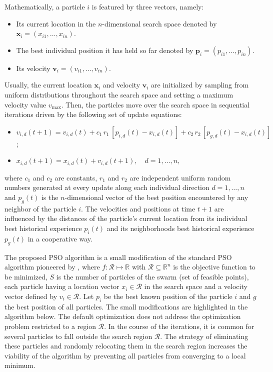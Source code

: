 \documentclass[10pt,letterpaper]{article}
\begin{document}
Mathematically, a particle $i$ is featured by three vectors, namely:
\begin{itemize}

\item
Its current location in the $n$-dimensional search space denoted by $\boldsymbol{x}_i = (x_{i1}, \ldots, x_{in})$.

\item
The best individual position it has held so far denoted by $\boldsymbol{p}_i = (p_{i1}, \ldots, p_{in})$.

\item
Its velocity $\boldsymbol{v}_i = (v_{i1}, \ldots, v_{in})$.

\end{itemize}
Usually, the current location $\boldsymbol{x}_i$ and velocity $\boldsymbol{v}_i $ are initialized by sampling from uniform distributions throughout the
search space and setting a maximum velocity value $v_{\mathrm{max}}$.
Then, the particles move over the search space in sequential iterations
driven by the following set of update equations:
\begin{itemize}

\item
$v_{i,d}(t+1) = v_{i,d}(t) + c_1\, r_1\, [p_{i,d}(t) - x_{i,d}(t)] + c_2\, r_2\, [p_{g,d}(t) - x_{i,d}(t)]$;

\item
$x_{i,d}(t+1) = x_{i,d}(t) + v_{i,d}(t+1), \quad d = 1, \ldots, n,$

\end{itemize}
where $c_1$ and $c_2$ are constants, $r_1$ and $r_2$ are independent uniform random numbers generated at
every update along each individual direction $d = 1, \ldots, n$ and $p_g(t)$ is the $n$-dimensional vector of the best position encountered by any neighbor of the particle $i$.
The velocities and positions
at time $t+1$ are influenced by the distances of the particle's current location from its individual best historical
experience $p_i(t)$ and its neighborhoods best historical experience $p_g(t)$ in a cooperative way.

The proposed PSO algorithm is a small modification of the standard PSO algorithm
pioneered by \cite{kennedyeberhart1995},  where $f: \mathcal{R} \mapsto \mathbb{R}$ with $\mathcal{R} \subseteq \mathbb{R}^n$
is the objective function to be minimized, $S$ is the number of particles of the swarm (set of feasible points),
each particle having a location vector $x_i \in \mathcal{R}$ in the search space and a velocity vector defined by $v_i \in \mathcal{R}$.
Let $p_i$ be the best known position of the particle $i$ and $g$ the best position of all particles.
The small modifications are highlighted in the algorithm below.
The default optimization does not address the optimization problem restricted to a region $\mathcal{R}$.
In the course of the iterations, it is common for several particles to fall outside the search region $\mathcal{R}$.
The strategy of eliminating these particles and randomly relocating them in the search region increases the
viability of the algorithm by preventing all particles from converging to a local minimum.
\end{document}
